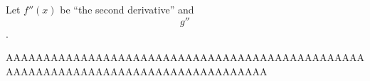 
Let $f''(x)$ be ``the second derivative'' and $$g''$$.

AAAAAAAAAAAAAAAAAAAAAAAAAAAAAAAAAAAAAAAAAAAAAAAAAAAAAAAAAAAAAAAAAAAAAAAAAAAAAAAAAAA
